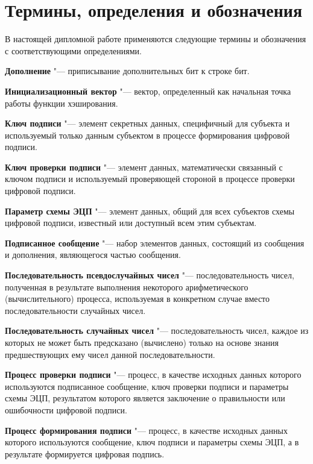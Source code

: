 \chapter{Термины, определения и обозначения}
\label{cha:ch_1}
\def\MYhyp{\addtocounter{MYc}{1}{\bf Определение \arabic{MYc}: }}
\par
В настоящей дипломной работе применяются следующие термины и обозначения с соответствующими определениями.
\par
\textbf{Дополнение} "--- приписывание дополнительных бит к строке бит.
\par
\textbf{Инициализационный вектор} "--- вектор, определенный как начальная точка работы функции хэширования.
\par
\textbf{Ключ подписи} "--- элемент секретных данных, специфичный для субъекта и используемый только данным субъектом в процессе формирования цифровой подписи.
\par
\textbf{Ключ проверки подписи} "--- элемент данных, математически связанный с ключом подписи и используемый проверяющей стороной в процессе проверки цифровой подписи.
\par
\textbf{Параметр схемы ЭЦП} "--- элемент данных, общий для всех субъектов схемы цифровой подписи, известный или доступный всем этим субъектам.
\par
\textbf{Подписанное сообщение} "--- набор элементов данных, состоящий из сообщения и дополнения, являющегося частью сообщения.
\par
\textbf{Последовательность псевдослучайных чисел} "--- последовательность чисел, полученная в результате выполнения некоторого арифметического (вычислительного) процесса, используемая в конкретном случае вместо последовательности случайных чисел.
\par
\textbf{Последовательность случайных чисел} "--- последовательность чисел, каждое из которых не может быть предсказано (вычислено) только на основе знания предшествующих ему чисел данной последовательности.
\par
\textbf{Процесс проверки подписи} "--- процесс, в качестве исходных данных которого используются подписанное сообщение, ключ проверки подписи и параметры схемы ЭЦП, результатом которого является заключение о правильности или ошибочности цифровой подписи.
\par
\textbf{Процесс формирования подписи} "--- процесс, в качестве исходных данных которого используются сообщение, ключ подписи и параметры схемы ЭЦП, а в результате формируется цифровая подпись.
\par
